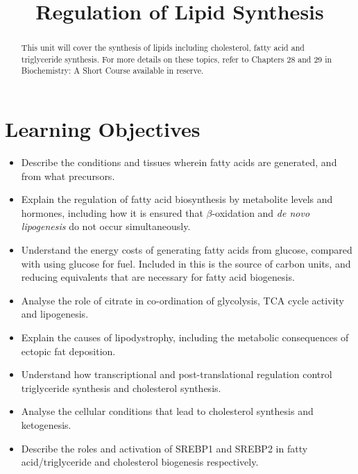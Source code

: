\documentclass{tufte-handout}
\title{Regulation of Lipid Synthesis}
\author{}
\date{}  %
\begin{document}
\maketitle%

\begin{abstract}
\noindent This unit will cover the synthesis of lipids including cholesterol, fatty acid and triglyceride synthesis.  For more details on these topics, refer to Chapters 28 and 29 in Biochemistry: A Short Course available in reserve\cite{Berg2015}.
\end{abstract}

\tableofcontents

\pagebreak
\section{Learning Objectives}

\begin{itemize}
\item Describe the conditions and tissues wherein fatty acids are generated, and from what precursors.
\item Explain the regulation of fatty acid biosynthesis by metabolite levels and hormones, including how it is ensured that $\beta$-oxidation and \textit{de novo lipogenesis} do not occur simultaneously.
\item Understand the energy costs of generating fatty acids from glucose, compared with using glucose for fuel.  Included in this is the source of carbon units, and reducing equivalents that are necessary for fatty acid biogenesis.
\item Analyse the role of citrate in co-ordination of glycolysis, TCA cycle activity and lipogenesis.
\item Explain the causes of lipodystrophy, including the metabolic consequences of ectopic fat deposition.
\item Understand how transcriptional and post-translational regulation control triglyceride synthesis and cholesterol synthesis.
\item Analyse the cellular conditions that lead to cholesterol synthesis and ketogenesis.
\item Describe the roles and activation of SREBP1 and SREBP2 in fatty acid/triglyceride and cholesterol biogenesis respectively.
\end{itemize}
\end{document}
